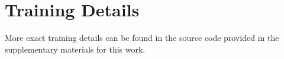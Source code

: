 \newpage
\section{Training Details}
\label{sec:appendix:trainingdetails}

\trainingdetailstable

More exact training details can be found in the source code provided in the supplementary materials for this work.